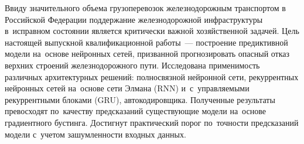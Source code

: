\thispagestyle{empty}

\begin{small}%
Ввиду значительного объема грузоперевозок железнодорожным транспортом в Российской Федерации поддержание железнодорожной инфраструктуры в~исправном состоянии является критически важной хозяйственной задачей.
Цель настоящей выпускной квалификационной работы~--- построение предиктивной модели на~основе нейронных сетей, призванной прогнозировать опасный отказ верхних строений железнодорожного пути.
Исследована применимость различных архитектурных решений: полносвязной нейронной сети, рекуррентных нейронных сетей на~основе сети Элмана (RNN) и~с~управляемыми рекуррентными блоками (GRU), автокодировщика.
Полученные результаты превосходят по~качеству предсказаний существующие модели на~основе градиентного бустинга.
Достигнут практический порог по~точности предсказаний модели с~учетом зашумленности входных данных.\par
\end{small}
